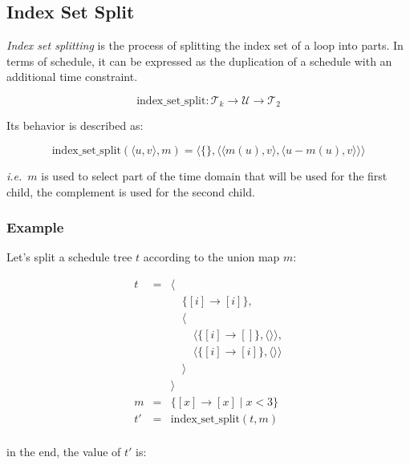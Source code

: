 \documentclass{article}
\begin{document}
\subsection{Index Set Split}

\emph{Index set splitting} is the process of splitting the index set of a loop
into parts. In terms of schedule, it can be expressed as the duplication of a
schedule with an additional time constraint.

\[
    \mathrm{index\_set\_split}: \mathcal{T}_k \rightarrow \mathcal{U} \rightarrow \mathcal{T}_2
\]

Its behavior is described as:

\[
    \mathrm{index\_set\_split}(\langle u, v\rangle, m) = \langle  \{\}, \langle  \langle  m(u), v\rangle, \langle  u - m(u), v\rangle \rangle \rangle
\]

\noindent \emph{i.e.}\ $m$ is used to select part of the time domain that will
be used for the first child, the complement is used for the second child.

\subsubsection*{Example}

Let's split a schedule tree $t$ according to the union map $m$:

\[
    \begin{array}{lcl}
        t &=& \langle \\
          & & \quad\{[i] \rightarrow [i] \},\\
          & & \quad\langle \\
          & & \quad\quad \langle\{ [i] \rightarrow [] \}, \langle\rangle\rangle,\\
          & & \quad\quad \langle\{ [i] \rightarrow [i] \}, \langle\rangle\rangle\\
          & & \quad\rangle \\
          & & \rangle \\
        m &=& \{ [x] \rightarrow [x] \mid x < 3 \} \\
        t'&=& \mathrm{index\_set\_split}(t, m) \\
    \end{array}
\]

\noindent in the end, the value of $t'$ is:
\end{document}
